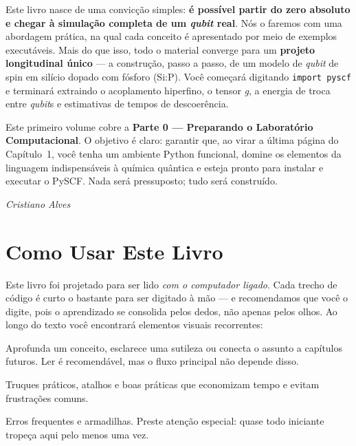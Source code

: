 \documentclass[11pt,a4paper,openany]{book}
\newcommand{\code}[1]{\texttt{#1}}
\newcommand{\pyscf}{\textsf{PySCF}}
\newcommand{\python}{\textsf{Python}}
\newcommand{\qubit}{\emph{qubit}}
\begin{document}
Este livro nasce de uma convicção simples: \textbf{é possível partir do zero
absoluto e chegar à simulação completa de um \qubit{} real}. Nós o faremos com
uma abordagem prática, na qual cada conceito é apresentado por meio de exemplos
executáveis. Mais do que isso, todo o material converge para um \textbf{projeto
longitudinal único} --- a construção, passo a passo, de um modelo de \qubit{} de
spin em silício dopado com fósforo (Si:P). Você começará digitando
\code{import pyscf} e terminará extraindo o acoplamento hiperfino, o tensor
\emph{g}, a energia de troca entre \qubit{}s e estimativas de tempos de
descoerência.

Este primeiro volume cobre a \textbf{Parte 0 --- Preparando o Laboratório
Computacional}. O objetivo é claro: garantir que, ao virar a última página do
Capítulo~1, você tenha um ambiente \python{} funcional, domine os elementos da
linguagem indispensáveis à química quântica e esteja pronto para instalar e
executar o \pyscf{}. Nada será pressuposto; tudo será construído.

\begin{flushright}
\itshape Cristiano Alves
\end{flushright}

\chapter*{Como Usar Este Livro}

Este livro foi projetado para ser lido \emph{com o computador ligado}. Cada
trecho de código é curto o bastante para ser digitado à mão --- e recomendamos
que você o digite, pois o aprendizado se consolida pelos dedos, não apenas pelos
olhos. Ao longo do texto você encontrará elementos visuais recorrentes:

\begin{caixanota}
Aprofunda um conceito, esclarece uma sutileza ou conecta o assunto a
capítulos futuros. Ler é recomendável, mas o fluxo principal não depende disso.
\end{caixanota}

\begin{caixadica}
Truques práticos, atalhos e boas práticas que economizam tempo e evitam
frustrações comuns.
\end{caixadica}

\begin{caixaatencao}
Erros frequentes e armadilhas. Preste atenção especial: quase todo iniciante
tropeça aqui pelo menos uma vez.
\end{caixaatencao}
\end{document}
